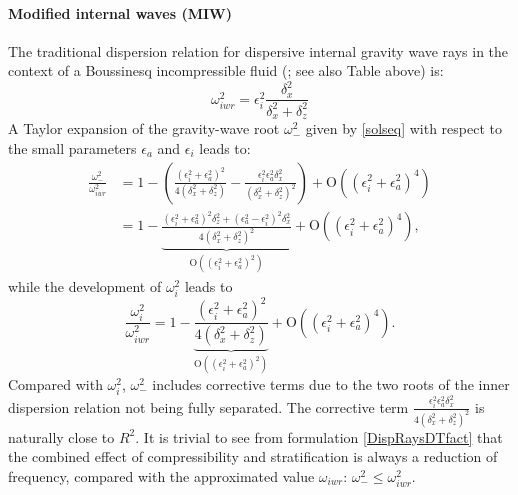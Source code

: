 \documentclass[a4paper,11pt]{article}
\begin{document}
\paragraph{Modified internal waves (MIW)}
The traditional dispersion relation for dispersive internal gravity wave rays in the context of a Boussinesq incompressible fluid (\citealt{gill_1982}; see also Table  above) is:
%
\begin{equation}
\omega_{iwr}^2=\epsilon_i^2\frac{ \delta_x^2}{\delta_x^2+\delta_z^2}
\label{DispRays}
\end{equation}
%
A Taylor expansion of the gravity-wave root $\omega_{-}^2$ given by \ref{solseq} with respect to the small parameters $\epsilon_a$ and $\epsilon_i$ leads to:
\begin{align}
\frac{\omega_-^2}{\omega_{iwr}^2}&=1
-
	\left(
	\frac{(\epsilon_i^2+\epsilon_a^2)^2}{4(\delta_x^2+\delta_z^2)}
	-\frac{\epsilon_i^2\epsilon_a^2 \delta_x^2}{(\delta_x^2+\delta_z^2)^2}
	\right)
+\mathrm{O}((\epsilon_i^{2}+\epsilon_a^{2})^4) \label{DispRaysDT}
\\
&=1
-\underbrace{\frac{(\epsilon_i^2+\epsilon_a^2)^2\delta_z^2+(\epsilon_a^2-\epsilon_i^2)^2\delta_x^2}{4(\delta_x^2+\delta_z^2)^2}}_{\mathrm{O}((\epsilon_i^{2}+\epsilon_a^{2})^2)}
+\mathrm{O}((\epsilon_i^{2}+\epsilon_a^{2})^4),  \label{DispRaysDTfact}
\end{align}
%
while the development of $\omega_i^2$ leads to
\[
\frac{\omega_i^2}{\omega_{iwr}^2}=1
-\underbrace{\frac{(\epsilon_i^2+\epsilon_a^2)^2}{4(\delta_x^2+\delta_z^2)}}_{\mathrm{O}((\epsilon_i^{2}+\epsilon_a^{2})^2)}
+\mathrm{O}((\epsilon_i^{2}+\epsilon_a^{2})^4).
\]
Compared with $\omega_i^2$, $\omega_-^2$ includes corrective terms due to the two roots of the inner dispersion relation not being fully separated. The corrective term $\displaystyle \frac{\epsilon_i^2\epsilon_a^2 \delta_x^2}{4(\delta_x^2+\delta_z^2)^2}$ is naturally close to $R^2$. It is trivial to see from formulation \ref{DispRaysDTfact} that the combined effect of compressibility and stratification is always a reduction of frequency, compared with the approximated value $\omega_{iwr}$: $\omega_-^2\le \omega_{iwr}^2$.\\
\end{document}

